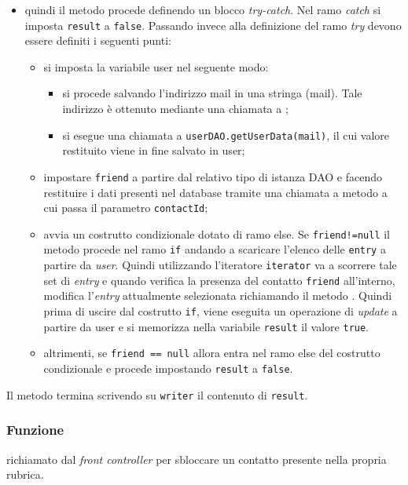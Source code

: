 \begin{description}
\begin{itemize}
		\item quindi il metodo procede definendo un blocco \textit{try-catch}. Nel ramo \textit{catch} si imposta \texttt{result} a \texttt{false}. Passando invece alla definizione del ramo \textit{try} devono essere definiti i seguenti punti:
		\begin{itemize}
			\item si imposta la variabile user nel seguente modo:
			\begin{itemize}
				\item si procede salvando l'indirizzo mail in una stringa (mail). Tale indirizzo è ottenuto mediante una chiamata a ;
				\item si esegue una chiamata a \texttt{userDAO.getUserData(mail)}, il cui valore restituito viene in fine salvato in user;
			\end{itemize}
			\item impostare  \texttt{friend} a partire dal relativo tipo di istanza DAO e facendo restituire i dati presenti nel database tramite una chiamata a metodo  a cui passa il parametro \texttt{contactId};
			\item avvia un costrutto condizionale dotato di ramo else. Se \texttt{friend!=null} il metodo procede nel ramo \texttt{if} andando a scaricare l'elenco delle \texttt{entry} a partire da \textit{user}. Quindi utilizzando l'iteratore \texttt{iterator} va a scorrere tale set di \textit{entry} e quando verifica la presenza del contatto \texttt{friend} all'interno, modifica l'\textit{entry} attualmente selezionata richiamando il metodo . Quindi prima di uscire dal costrutto \texttt{if}, viene eseguita un operazione di \textit{update} a partire da user e si memorizza nella variabile \texttt{result} il valore \texttt{true}.
			\item altrimenti, se \texttt{friend == null} allora entra nel ramo else del costrutto condizionale e procede impostando \texttt{result} a \texttt{false}.
		\end{itemize}
	\end{itemize}
	Il metodo termina scrivendo su \texttt{writer} il contenuto di \texttt{result}.
	
\end{description}



\subsubsection*{Funzione}
 richiamato dal \textit{front controller} per sbloccare un contatto presente nella propria rubrica.


